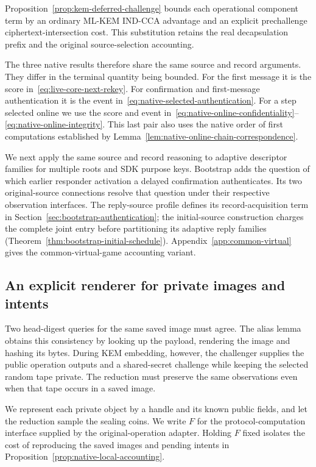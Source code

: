 \documentclass[pdflatex]{sn-jnl}
\theoremstyle{thmstyleone}
\theoremstyle{thmstylethree}
\theoremstyle{thmstyletwo}
\begin{document}
Proposition~\ref{prop:kem-deferred-challenge} bounds each operational
component term by an ordinary ML-KEM IND-CCA advantage and an explicit
prechallenge ciphertext-intersection cost. This substitution retains the
real decapsulation prefix and the original source-selection accounting.

The three native results therefore share the same source and record
arguments. They differ in the terminal quantity being bounded.
For the first message it is the score in~\eqref{eq:live-core-next-rekey}.
For confirmation and first-message authentication it is the event
in~\eqref{eq:native-selected-authentication}. For a step selected online
we use the score and event in~\eqref{eq:native-online-confidentiality}--%
\eqref{eq:native-online-integrity}. This last pair also uses the native
order of first computations established by
Lemma~\ref{lem:native-online-chain-correspondence}.

We next apply the same source and record reasoning to adaptive descriptor
families for multiple roots and SDK purpose keys. Bootstrap adds the
question of which earlier responder activation a delayed confirmation
authenticates. Its two original-source connections resolve that question
under their respective observation interfaces. The reply-source profile
defines its record-acquisition term in
Section~\ref{sec:bootstrap-authentication}; the initial-source construction
charges the complete joint entry before partitioning its adaptive reply families
(Theorem~\ref{thm:bootstrap-initial-schedule}). Appendix~\ref{app:common-virtual}
gives the common-virtual-game accounting variant.

\subsection{An explicit renderer for private images and intents}
\label{sec:opaque-rendering}

Two head-digest queries for the same saved image must agree. The alias
lemma obtains this consistency by looking up the payload, rendering the
image and hashing its bytes. During KEM embedding, however, the challenger
supplies the public operation outputs and a shared-secret challenge while
keeping the selected random tape private. The reduction must preserve
the same observations even when that tape occurs in a saved image.

We represent each private object by a handle and its known public fields,
and let the reduction sample the sealing coins. We write $F$ for the
protocol-computation interface supplied by the original-operation adapter.
Holding $F$ fixed isolates the cost of reproducing the saved
images and pending intents in
Proposition~\ref{prop:native-local-accounting}.
\end{document}
